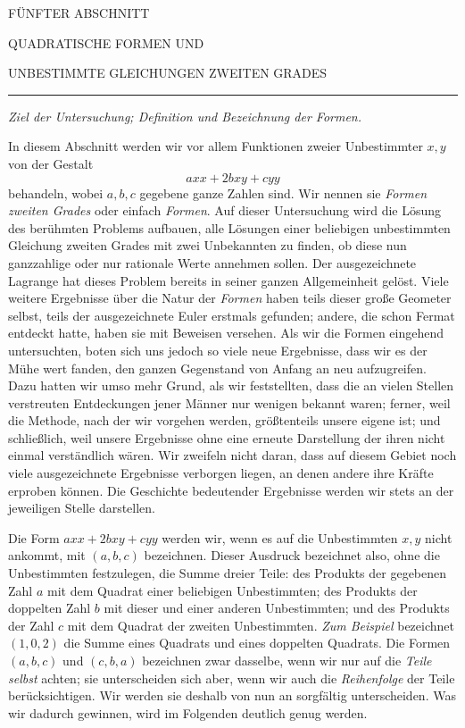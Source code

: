 \begin{center}
FÜNFTER ABSCHNITT

QUADRATISCHE FORMEN UND

UNBESTIMMTE GLEICHUNGEN ZWEITEN GRADES
\end{center}
\begin{center}\rule{.35\linewidth}{.4pt}\end{center}

\begin{center}
\textit{Ziel der Untersuchung; Definition und Bezeichnung der Formen.}
\end{center}

In diesem Abschnitt werden wir vor allem Funktionen zweier Unbestimmter $x,y$ von der Gestalt
\[
axx+2bxy+cyy
\]
behandeln, wobei $a,b,c$ gegebene ganze Zahlen sind. Wir nennen sie \textit{Formen zweiten Grades} oder einfach \textit{Formen}. Auf dieser Untersuchung wird die Lösung des berühmten Problems aufbauen, alle Lösungen einer beliebigen unbestimmten Gleichung zweiten Grades mit zwei Unbekannten zu finden, ob diese nun ganzzahlige oder nur rationale Werte annehmen sollen. Der ausgezeichnete Lagrange hat dieses Problem bereits in seiner ganzen Allgemeinheit gelöst. Viele weitere Ergebnisse über die Natur der \textit{Formen} haben teils dieser große Geometer selbst, teils der ausgezeichnete Euler erstmals gefunden; andere, die schon Fermat entdeckt hatte, haben sie mit Beweisen versehen. Als wir die Formen eingehend untersuchten, boten sich uns jedoch so viele neue Ergebnisse, dass wir es der Mühe wert fanden, den ganzen Gegenstand von Anfang an neu aufzugreifen. Dazu hatten wir umso mehr Grund, als wir feststellten, dass die an vielen Stellen verstreuten Entdeckungen jener Männer nur wenigen bekannt waren; ferner, weil die Methode, nach der wir vorgehen werden, größtenteils unsere eigene ist; und schließlich,
weil unsere Ergebnisse ohne eine erneute Darstellung der ihren nicht einmal verständlich wären. Wir zweifeln nicht daran, dass auf diesem Gebiet noch viele ausgezeichnete Ergebnisse verborgen liegen, an denen andere ihre Kräfte erproben können. Die Geschichte bedeutender Ergebnisse werden wir stets an der jeweiligen Stelle darstellen.

Die Form $axx+2bxy+cyy$ werden wir, wenn es auf die Unbestimmten $x,y$ nicht ankommt, mit $(a,b,c)$ bezeichnen. Dieser Ausdruck bezeichnet also, ohne die Unbestimmten festzulegen, die Summe dreier Teile: des Produkts der gegebenen Zahl $a$ mit dem Quadrat einer beliebigen Unbestimmten; des Produkts der doppelten Zahl $b$ mit dieser und einer anderen Unbestimmten; und des Produkts der Zahl $c$ mit dem Quadrat der zweiten Unbestimmten. \textit{Zum Beispiel} bezeichnet $(1,0,2)$ die Summe eines Quadrats und eines doppelten Quadrats. Die Formen $(a,b,c)$ und $(c,b,a)$ bezeichnen zwar dasselbe, wenn wir nur auf die \textit{Teile selbst} achten; sie unterscheiden sich aber, wenn wir auch die \textit{Reihenfolge} der Teile berücksichtigen. Wir werden sie deshalb von nun an sorgfältig unterscheiden. Was wir dadurch gewinnen, wird im Folgenden deutlich genug werden.

